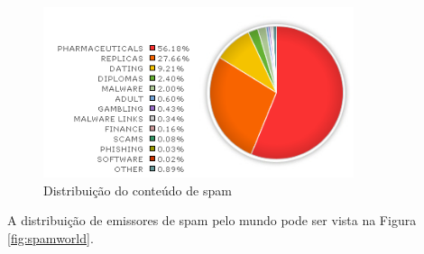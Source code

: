 \documentclass[a4paper,dvipdfm]{article}
\begin{document}
		\begin{figure}
			\centering
			\includegraphics [height=5cm] {Imagens/m86security/spamtype.png}
			\caption {Distribuição do conteúdo de spam}
			\label{fig:spamtype}
		\end{figure}

		A distribuição de emissores de spam pelo mundo pode ser vista na Figura \ref{fig:spamworld}.
\end{document}

